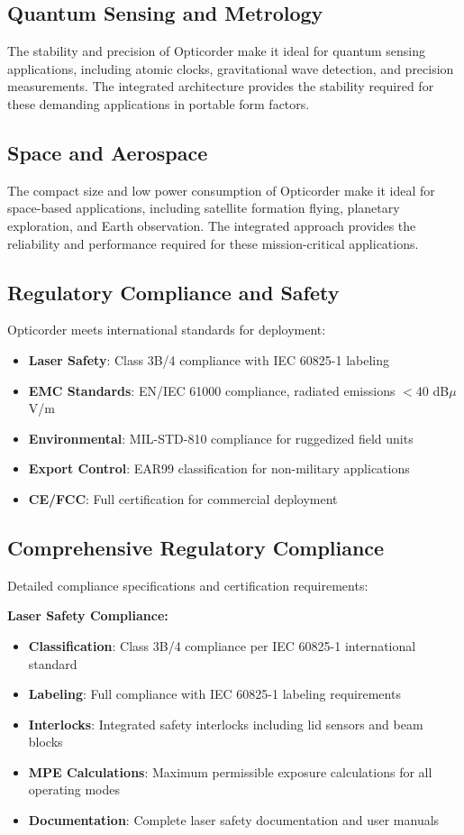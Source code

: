 \documentclass[11pt,a4paper]{article}
\begin{document}
\subsection{Quantum Sensing and Metrology}
The stability and precision of Opticorder make it ideal for quantum sensing applications, including atomic clocks, gravitational wave detection, and precision measurements. The integrated architecture provides the stability required for these demanding applications in portable form factors.

\subsection{Space and Aerospace}
The compact size and low power consumption of Opticorder make it ideal for space-based applications, including satellite formation flying, planetary exploration, and Earth observation. The integrated approach provides the reliability and performance required for these mission-critical applications.

\subsection{Regulatory Compliance and Safety}
Opticorder meets international standards for deployment:
\begin{itemize}
\item \textbf{Laser Safety}: Class 3B/4 compliance with IEC 60825-1 labeling
\item \textbf{EMC Standards}: EN/IEC 61000 compliance, radiated emissions $<$40 dB$\mu$V/m
\item \textbf{Environmental}: MIL-STD-810 compliance for ruggedized field units
\item \textbf{Export Control}: EAR99 classification for non-military applications
\item \textbf{CE/FCC}: Full certification for commercial deployment
\end{itemize}

\subsection{Comprehensive Regulatory Compliance}
Detailed compliance specifications and certification requirements:

\textbf{Laser Safety Compliance:}
\begin{itemize}
\item \textbf{Classification}: Class 3B/4 compliance per IEC 60825-1 international standard
\item \textbf{Labeling}: Full compliance with IEC 60825-1 labeling requirements
\item \textbf{Interlocks}: Integrated safety interlocks including lid sensors and beam blocks
\item \textbf{MPE Calculations}: Maximum permissible exposure calculations for all operating modes
\item \textbf{Documentation}: Complete laser safety documentation and user manuals
\end{itemize}
\end{document}
